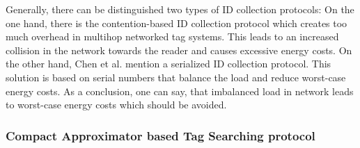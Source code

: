 Generally, there can be distinguished two types of ID collection protocols: On the one hand, there is the contention-based ID collection protocol which creates too much overhead in multihop networked tag systems. This leads to an increased collision in the network towards the reader and causes excessive energy costs. On the other hand, Chen et al. mention a serialized ID collection protocol. This solution is based on serial numbers that balance the load and reduce worst-case energy costs. 
As a conclusion, one can say, that imbalanced load in network leads to worst-case energy costs which should be avoided.

\subsubsection{Compact Approximator based Tag Searching protocol}

